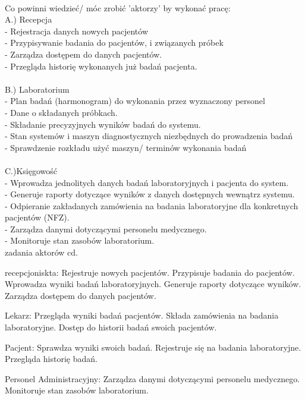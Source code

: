 \documentclass[12pt,a4paper]{article}
\begin{document}
\\
 Co powinni wiedzieć/ móc zrobić 'aktorzy' by wykonać pracę:\\
 A.) Recepcja\\
 - Rejestracja danych nowych pacjentów\\
 - Przypisywanie badania do pacjentów, i związanych próbek\\
 - Zarządza dostępem do danych pacjentów.\\
 - Przegląda historię wykonanych już badań pacjenta.\\
 \\
 B.) Laboratorium \\
 - Plan badań (harmonogram) do wykonania przez wyznaczony personel\\
 - Dane o składanych próbkach.\\
 - Składanie precyzyjnych wyników badań do systemu.\\
 - Stan systemów i maszyn diagnostycznych niezbędnych do prowadzenia badań\\
 - Sprawdzenie rozkładu użyć maszyn/ terminów wykonania badań\\
 \\
 C.)Księgowość \\
 - Wprowadza jednolitych danych badań laboratoryjnych i pacjenta do system.\\
 - Generuje raporty dotyczące wyników z danych dostępnych wewnątrz systemu.\\
 - Odpieranie zakładanych zamówienia na badania laboratoryjne dla konkretnych pacjentów (NFZ).\\
 - Zarządza danymi dotyczącymi personelu medycznego.\\
 - Monitoruje stan zasobów laboratorium.\\


 





zadania aktorów cd.

recepcjoniskta:
Rejestruje nowych pacjentów.
Przypisuje badania do pacjentów.
Wprowadza wyniki badań laboratoryjnych.
Generuje raporty dotyczące wyników.
Zarządza dostępem do danych pacjentów.

Lekarz:
Przegląda wyniki badań pacjentów.
Składa zamówienia na badania laboratoryjne.
Dostęp do historii badań swoich pacjentów.

Pacjent:
Sprawdza wyniki swoich badań.
Rejestruje się na badania laboratoryjne.
Przegląda historię badań.

Personel Administracyjny:
Zarządza danymi dotyczącymi personelu medycznego.
Monitoruje stan zasobów laboratorium.
\end{document}

